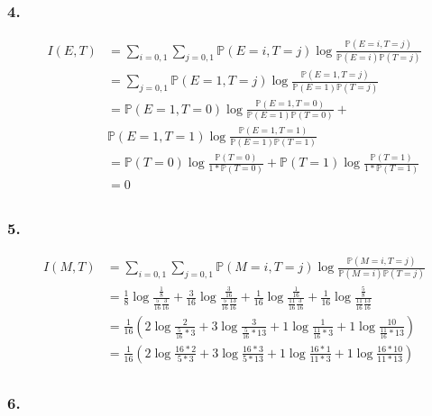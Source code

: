 \documentclass{article}
\newcommand{\1}{\mathbf{1}}
\renewcommand{\P}{\mathbb{P}}
\begin{document}
\subsubsection{4.}
\begin{align*}
  I(E, T)
   & = \sum_{i=0, 1}\sum_{j=0,1} \P(E = i, T = j) \log \frac{\P(E = i, T = j)}{\P(E = i) \P(T = j)}    \\
   & = \sum_{j=0,1} \P(E = 1, T = j) \log \frac{\P(E = 1, T = j)}{\P(E = 1) \P(T = j)}                 \\
   & = \P(E = 1, T = 0) \log \frac{\P(E = 1, T = 0)}{\P(E = 1) \P(T = 0)} +                            \\
   & \P(E = 1, T = 1) \log \frac{\P(E = 1, T = 1)}{\P(E = 1) \P(T = 1)}                                \\
   & = \P(T = 0) \log \frac{\P(T = 0)}{1 * \P(T = 0)} + \P(T = 1) \log \frac{\P(T = 1)}{1 * \P(T = 1)} \\
   & = 0                                                                                               \\
\end{align*}

\subsubsection{5.}
\begin{align*}
  I(M, T)
   & = \sum_{i=0, 1}\sum_{j=0,1} \P(M = i, T = j) \log \frac{\P(M = i, T = j)}{\P(M = i) \P(T = j)} \\
   & =
  \frac{1}{8} \log \frac{\frac{1}{8}}{\frac{5}{16}\frac{3}{16}} +
  \frac{3}{16} \log \frac{\frac{3}{16}}{\frac{5}{16}\frac{13}{16}} +
  \frac{1}{16} \log \frac{\frac{1}{16}}{\frac{11}{16}\frac{3}{16}} +
  \frac{1}{16} \log \frac{\frac{5}{8}}{\frac{11}{16}\frac{13}{16}}
  \\
   & =
  \frac{1}{16} \left(
  2 \log \frac{2}{\frac{5}{16} * 3} +
  3 \log \frac{3}{\frac{5}{16} * 13} +
  1 \log \frac{1}{\frac{11}{16} * 3} +
  1 \log \frac{10}{\frac{11}{16} * 13}
  \right)
  \\
   & =
  \frac{1}{16} \left(
  2 \log \frac{16*2}{5 * 3} +
  3 \log \frac{16*3}{5 * 13} +
  1 \log \frac{16*1}{11 * 3} +
  1 \log \frac{16*10}{11 * 13}
  \right)
  \\
\end{align*}


\subsubsection{6.}
\end{document}
